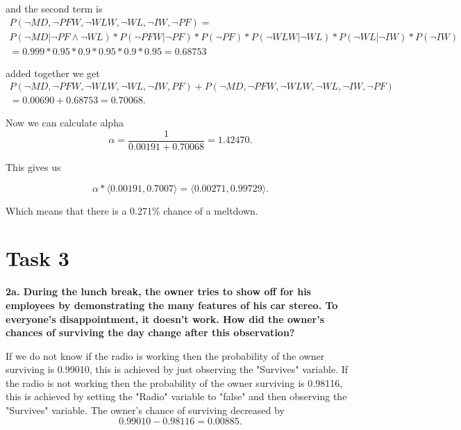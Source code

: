 \documentclass[a4paper,10pt]{article}
\begin{document}
and the second term is
\begin{multline*}
	P(\neg MD, \neg PFW, \neg WLW, \neg WL, \neg IW, \neg PF) = \\
	P(\neg MD | \neg PF \wedge \neg WL) * P(\neg PFW | \neg PF) * P(\neg PF) * P(\neg WLW | \neg WL) * P(\neg WL | \neg IW) * P(\neg IW) \\
	= 0.999 * 0.95 * 0.9 * 0.95 * 0.9 * 0.95 = 0.68753
\end{multline*}

added together we get
\begin{multline*}
	P(\neg MD, \neg PFW, \neg WLW, \neg WL, \neg IW, PF) + P(\neg MD, \neg PFW, \neg WLW, \neg WL, \neg IW, \neg PF) \\ 
	= 0.00690 + 0.68753 = 0.70068.
\end{multline*}

Now we can calculate alpha
\begin{equation*}
	\alpha = \frac{1}{0.00191 + 0.70068} = 1.42470.
\end{equation*}

This gives us

\begin{equation*}
	\alpha * \langle 0.00191, 0.7007\rangle = \langle 0.00271, 0.99729\rangle.
\end{equation*}

Which means that there is a 0.271\% chance of a meltdown.

\section*{Task 3}

\textbf{2a. During the lunch break, the owner tries to show off for his employees by demonstrating the many features of his car stereo.
 To everyone's disappointment, it doesn't work. 
 How did the owner's chances of surviving the day change after this observation?}

 If we do not know if the radio is working then the probability of the owner surviving is 0.99010, this is achieved by just observing the "Survives" variable.
 If the radio is not working then the probability of the owner surviving is 0.98116, this is achieved by setting the "Radio" variable to "false" and
 then observing the "Survives" variable.
 The owner's chance of surviving decreased by 
 \begin{equation*}
	0.99010 - 0.98116 = 0.00885.
 \end{equation*} 
\end{document}

